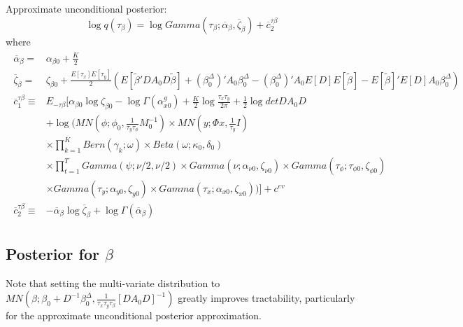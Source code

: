 \documentclass[11pt]{article}
\begin{document}
Approximate unconditional posterior:
\begin{equation}
	\log q\left(\tau_{\beta}\right) = \log Gamma\left(\tau_{\beta};\overline{\alpha}_{\beta},\overline{\zeta}_{\beta}\right)+\overline{c}_{2}^{\tau\beta}
\end{equation}
where
\begin{align*}
\begin{split}
	\overline{\alpha}_{\beta}=&\alpha_{\beta0}+\frac{K}{2}\\\overline{\zeta}_{\beta}=&\zeta_{\beta0}+\frac{E\left[\tau_{x}\right]E\left[\tau_{y}\right]}{2}\left(E\left[\tilde{\beta}'DA_{0}D\tilde{\beta}\right]+\left(\beta_{0}^{\Delta}\right)'A_{0}\beta_{0}^{\Delta}-\left(\beta_{0}^{\Delta}\right)'A_{0}E\left[D\right]E\left[\tilde{\beta}\right]-E\left[\tilde{\beta}\right]'E\left[D\right]A_{0}\beta_{0}^{\Delta}\right)\\\overline{c}_{1}^{\tau\beta}\equiv&E_{-\tau\beta}\Bigg[\alpha_{\beta0}\log\zeta_{\beta0}-\log\Gamma\left(\alpha_{x0}^{g}\right)+\frac{K}{2}\log\frac{\tau_{x}\tau_{y}}{2\pi}+\frac{1}{2}\log detDA_{0}D\\&+\log\Bigg(MN\left(\phi;\phi_{0},\frac{1}{\tau_{y}\tau_{\phi}}M_{0}^{-1}\right)\times MN\left(y;\Phi x,\frac{1}{\tau_{y}}I\right)\\&\times\prod_{k=1}^{K}Bern\left(\gamma_{k};\omega\right)\times Beta\left(\omega;\kappa_{0},\delta_{0}\right)\\&\times\prod_{t=1}^{T}Gamma\left(\psi;\nu/2,\nu/2\right)\times Gamma\left(\nu;\alpha_{\nu0},\zeta_{\nu0}\right)\times Gamma\left(\tau_{\phi};\tau_{\phi0},\zeta_{\phi0}\right)\\&\times Gamma\left(\tau_{y};\alpha_{y0},\zeta_{y0}\right)\times Gamma\left(\tau_{x};\alpha_{x0},\zeta_{x0}\right)\Bigg)\Bigg]+c^{ev}\\\overline{c}_{2}^{\tau\beta}\equiv&-\overline{\alpha}_{\beta}\log\overline{\zeta}_{\beta}+\log\Gamma\left(\overline{\alpha}_{\beta}\right)
\end{split}
\end{align*}

\subsection{Posterior for $\beta$}
Note that setting the multi-variate distribution to $MN\left(\beta;\beta_{0}+D^{-1}\beta_{0}^{\Delta},\frac{1}{\tau_{x}\tau_{y}\tau_{\beta}}\left[DA_{0}D\right]^{-1}\right)$ greatly improves tractability, particularly for the approximate unconditional posterior approximation. 
\end{document}
